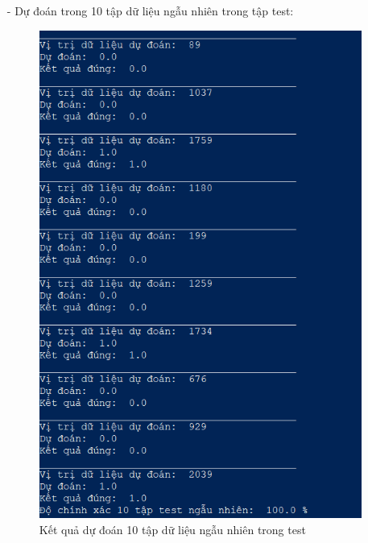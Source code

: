 \documentclass{report}
\begin{document}
\begin{enumerate}
            \item [- ] Dự đoán trong 10 tập dữ liệu ngẫu nhiên trong tập test:
                \begin{center}
                    \begin{figure}[htp]
                        \begin{center}
                            \includegraphics[scale = 0.9]{image/KNN_2.png}
                            \caption{Kết quả dự đoán 10 tập dữ liệu ngẫu nhiên trong test}
                        \end{center}
                    \end{figure}
                \end{center}
        \end{enumerate}
        
\end{document}
